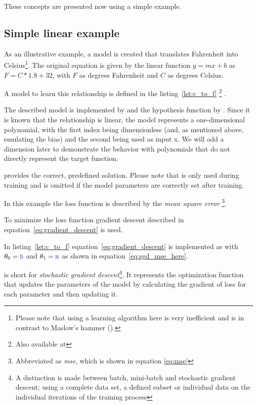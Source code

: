 These concepts are presented now using a simple example.

\subsection{Simple linear example} \label{ch:simple_linear_example}

As an illustrative example, a model is created that translates Fahrenheit into Celsius\footnote{Please note that using a learning algorithm here is very inefficient and is in contrast to Maslow's hammer ().}.
The original equation is given by the linear function $y = mx + b$ as $F = C * 1.8 + 32$, with $F$ as degrees Fahrenheit and $C$ as degrees Celsius.

A model to learn this relationship is defined in the listing~\ref{lst:c_to_f} \footnote{Also available at } .



The described model is implemented by  and the hypothesis function by .
Since it is known that the relationship is linear, the model represents a one-dimensional polynomial, with the first index being dimensionless (and, as mentioned above, emulating the bias) and the second being used as input x.
We will add a dimension later to demonstrate the behavior with polynomials that do not directly represent the target function.

 provides the correct, predefined solution.
Please note that  is only used during training and is omitted if the model parameters are correctly set after training.

In this example the loss function is described by the \textit{mean square error } \footnote{ Abbreviated as \textit{mse}, which is shown in equation \eqref{eq:mse}}.

To minimize the loss function gradient descent described in equation~\eqref{eq:gradient_descent} is used.

In listing~\ref{lst:c_to_f} equation~\eqref{eq:gradient_descent} is implemented as  with $\theta_0 = \code{b}$ and $\theta_1= \code{m}$ as shown in equation~\eqref{eq:sgd_mse_here}.

 is short for \textit{stochastic gradient descent}\footnote{A distinction is made between batch, mini-batch and stochastic gradient descent; using a complete data set, a defined subset or individual data on the individual iterations of the training process}.
It represents the optimization function that updates the parameters of the model by calculating the gradient of loss for each parameter and then updating it.

